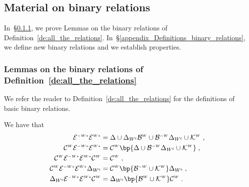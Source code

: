\documentclass[12pt]{article}
\begin{document}
{{{{{{\subsection{Material on binary relations}
\label{Material_on_binary_relations}

In~\S\ref{appendix_Lemmas_binary_relations},
we prove Lemmas on the binary relations of
Definition~\ref{de:all_the_relations}.
In~\S\ref{appendix_Definitions_binary_relations},
we define new binary relations and we establish properties.


\subsubsection{Lemmas on the binary relations of Definition~\ref{de:all_the_relations}}
\label{appendix_Lemmas_binary_relations}

We refer the reader to Definition~\ref{de:all_the_relations}
for the definitions of basic binary relations.

\begin{lemma}
  We have that
  \begin{subequations}
    \begin{align}
      \ConverseConditionalAncestor \ConditionalAncestor
      &=
        {\Delta 
        \cup
        \Delta_{\Complementary{\AgentSubsetW}} \ConditionalAscendent 
        \cup \ConverseConditionalAscendent \Delta_{\Complementary{\AgentSubsetW}}
        \cup \ConditionalCommonCause
        }
        \eqfinv
        \label{eq:AA}
      \\
      \Cousinhood \ConverseConditionalAncestor \ConditionalAncestor
      &=
        \Cousinhood \bp{
        \Delta \cup
        \ConverseConditionalAscendent
        \Delta_{{\Complementary{\AgentSubsetW}}}
        \cup \ConditionalCommonCause}
        \eqfinv
        \label{eq:CEmEsubset}
     \\
      \Cousinhood \ConverseConditionalAncestor \ConditionalAncestor \Cousinhood
      &= \Cousinhood
        \eqfinv
        \label{eq:gammaAAgamma}
      \\
      \Cousinhood \ConverseConditionalAncestor \ConditionalAncestor
      \Delta_{\Complementary{\AgentSubsetW}}
      &= \Cousinhood \bp{
        \ConverseConditionalAscendent 
        \cup \ConditionalCommonCause}
        \Delta_{\Complementary{\AgentSubsetW}}
        \eqfinv
        \label{eq:gammaAADelta}
      \\
      \Delta_{\Complementary{\AgentSubsetW}} \ConverseConditionalAncestor \ConditionalAncestor    \Cousinhood 
      &=
        \Delta_{\Complementary{\AgentSubsetW}}
        \bp{
        \ConditionalAscendent 
        \cup \ConditionalCommonCause}
        \Cousinhood
        \eqfinp
        \label{eq:DeltaAAgamma}
     \end{align}
  \end{subequations}
\end{lemma}




}}}}}}
\end{document}
